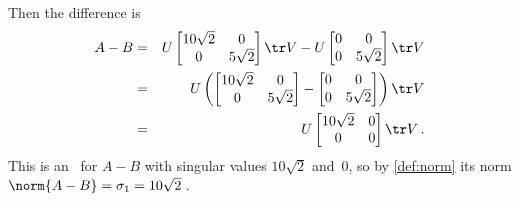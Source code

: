 \begin{example}
\begin{enumerate}
\begin{enumerate}
\begin{solution}
\begin{eqnarray*}
\end{eqnarray*}
Then the difference is
\begin{eqnarray*}
A-B&=&U\begin{bmatrix} 10\sqrt2&0\\0&5\sqrt2 \end{bmatrix}\tr V
-U\begin{bmatrix} 0&0\\0&5\sqrt2 \end{bmatrix}\tr V
\\&=&U\left(\begin{bmatrix} 10\sqrt2&0\\0&5\sqrt2 \end{bmatrix}
-\begin{bmatrix} 0&0\\0&5\sqrt2 \end{bmatrix}\right)\tr V
\\&=&U\begin{bmatrix} 10\sqrt2&0\\0&0 \end{bmatrix}\tr V\,.
\end{eqnarray*}
This is an \svd\ for \(A-B\) with singular values \(10\sqrt2\) and~\(0\), so by \autoref{def:norm} its norm \(\norm{A-B}=\sigma_1=10\sqrt2\)\,.
\end{solution}


\end{enumerate}
\end{enumerate}
\end{example}
